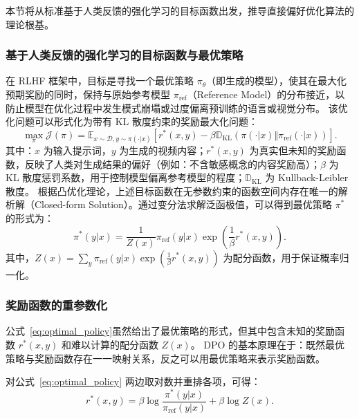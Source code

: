 本节将从标准基于人类反馈的强化学习的目标函数出发，推导直接偏好优化算法的理论根基。

\subsubsection{基于人类反馈的强化学习的目标函数与最优策略}

在 RLHF 框架中，目标是寻找一个最优策略 $\pi_{\theta}$（即生成的模型），使其在最大化预期奖励的同时，保持与原始参考模型 $\pi_{\text{ref}}$（Reference Model）的分布接近，以防止模型在优化过程中发生模式崩塌或过度偏离预训练的语言或视觉分布。
该优化问题可以形式化为带有 KL 散度约束的奖励最大化问题：
\begin{equation}
\max_{\pi} \mathcal{J}(\pi) = \mathbb{E}_{x \sim \mathcal{D}, y \sim \pi(\cdot|x)} \left[ r^*(x, y) - \beta \mathbb{D}_{\text{KL}}(\pi(\cdot|x) \Vert \pi_{\text{ref}}(\cdot|x)) \right].
\end{equation}
其中：$x$ 为输入提示词，$y$ 为生成的视频内容；$r^*(x, y)$ 为真实但未知的奖励函数，反映了人类对生成结果的偏好（例如：不含敏感概念的内容奖励高）；$\beta$ 为 KL 散度惩罚系数，用于控制模型偏离参考模型的程度；$\mathbb{D}_{\text{KL}}$ 为 Kullback-Leibler 散度。
根据凸优化理论，上述目标函数在无参数约束的函数空间内存在唯一的解析解（Closed-form Solution）。通过变分法求解泛函极值，可以得到最优策略 $\pi^*$ 的形式为：
\begin{equation}\label{eq:optimal_policy}
\pi^*(y|x) = \frac{1}{Z(x)} \pi_{\text{ref}}(y|x) \exp \left( \frac{1}{\beta} r^*(x, y) \right).
\end{equation}
其中，$Z(x) = \sum_y \pi_{\text{ref}}(y|x) \exp(\frac{1}{\beta} r^*(x, y))$ 为配分函数，用于保证概率归一化。~\cite{sutton1998reinforcement}

\subsubsection{奖励函数的重参数化}

公式~\ref{eq:optimal_policy}虽然给出了最优策略的形式，但其中包含未知的奖励函数 $r^*(x, y)$ 和难以计算的配分函数 $Z(x)$。
DPO 的基本原理在于：既然最优策略与奖励函数存在一一映射关系，反之可以用最优策略来表示奖励函数。

对公式~\ref{eq:optimal_policy} 两边取对数并重排各项，可得：
\begin{equation}\label{eq:reward_function}
r^*(x, y) = \beta \log \frac{\pi^*(y|x)}{\pi_{\text{ref}}(y|x)} + \beta \log Z(x).
\end{equation}

